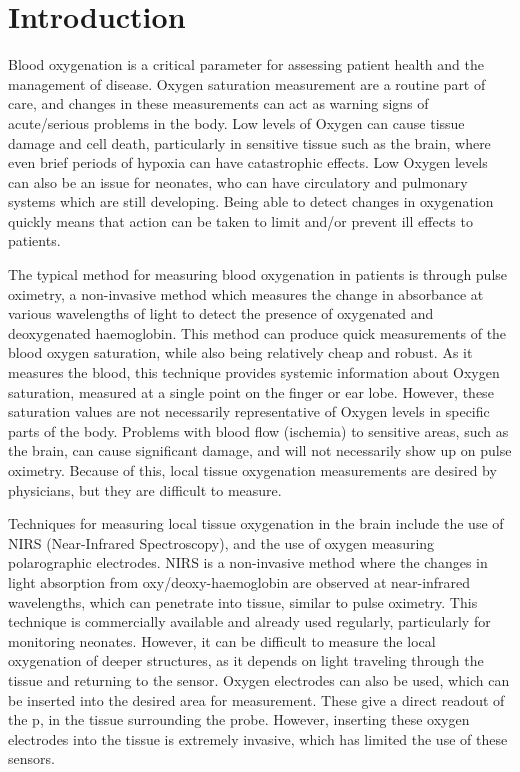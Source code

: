 \chapter{Introduction}\label{ch:intro}

Blood oxygenation is a critical parameter for assessing patient health and the management of disease.
Oxygen saturation measurement are a routine part of care, and changes in these measurements can act as warning signs of acute/serious problems in the body.
Low levels of Oxygen can cause tissue damage and cell death, particularly in sensitive tissue such as the brain, where even brief periods of
hypoxia can have catastrophic effects.
Low Oxygen levels can also be an issue for neonates, who can have circulatory and pulmonary systems which are still developing.
Being able to detect changes in oxygenation quickly means that action can be taken to limit and/or prevent ill effects to patients.

The typical method for measuring blood oxygenation in patients is through pulse oximetry, a non-invasive method which measures the change in absorbance at various wavelengths of light to detect the presence of oxygenated and deoxygenated haemoglobin.
This method can produce quick measurements of the blood oxygen saturation, while also being relatively cheap and robust.
As it measures the blood, this technique provides systemic information about Oxygen saturation, measured at a single point on the finger or ear lobe.
However, these saturation values are not necessarily representative of Oxygen levels in specific parts of the body.
Problems with blood flow (ischemia) to sensitive areas, such as the brain, can cause significant damage, and will not necessarily show up on pulse oximetry.
Because of this, local tissue oxygenation measurements are desired by physicians, but they are difficult to measure.

Techniques for measuring local tissue oxygenation in the brain include the use of NIRS (Near-Infrared Spectroscopy), and the use of oxygen measuring
polarographic electrodes.
NIRS is a non-invasive method where the changes in light absorption from oxy/deoxy-haemoglobin are observed at near-infrared wavelengths, which can penetrate
into tissue, similar to pulse oximetry.
This technique is commercially available and already used regularly, particularly for monitoring neonates.
However, it can be difficult to measure the local oxygenation of deeper structures, as it depends on light traveling through the tissue and returning to the sensor.
Oxygen electrodes can also be used, which can be inserted into the desired area for measurement.
These give a direct readout of the p\Otwo, in the tissue surrounding the probe.
However, inserting these oxygen electrodes into the tissue is extremely invasive, which has limited the use of these sensors.

